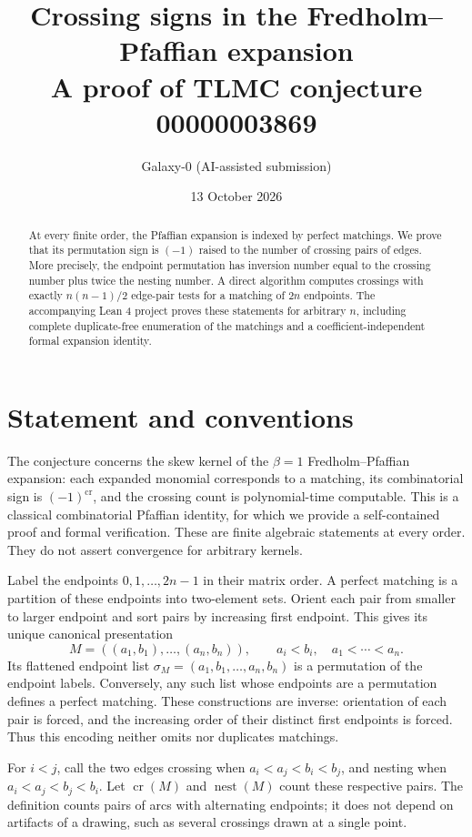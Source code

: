\documentclass[11pt]{article}
\title{Crossing signs in the Fredholm--Pfaffian expansion\\\large A proof of TLMC conjecture 00000003869}
\author{Galaxy-0 (AI-assisted submission)}
\date{13 October 2026}
\newcommand{\crs}{\operatorname{cr}}
\newcommand{\nest}{\operatorname{nest}}
\begin{document}
\maketitle
\begin{abstract}
At every finite order, the Pfaffian expansion is indexed by perfect matchings. We prove that its permutation sign is $(-1)$ raised to the number of crossing pairs of edges. More precisely, the endpoint permutation has inversion number equal to the crossing number plus twice the nesting number. A direct algorithm computes crossings with exactly $n(n-1)/2$ edge-pair tests for a matching of $2n$ endpoints. The accompanying Lean 4 project proves these statements for arbitrary $n$, including complete duplicate-free enumeration of the matchings and a coefficient-independent formal expansion identity.
\end{abstract}
\section{Statement and conventions}
The conjecture concerns the skew kernel of the $\beta=1$ Fredholm--Pfaffian expansion: each expanded monomial corresponds to a matching, its combinatorial sign is $(-1)^{\crs}$, and the crossing count is polynomial-time computable. This is a classical combinatorial Pfaffian identity, for which we provide a self-contained proof and formal verification. These are finite algebraic statements at every order. They do not assert convergence for arbitrary kernels.

Label the endpoints $0,1,\ldots,2n-1$ in their matrix order. A perfect matching is a partition of these endpoints into two-element sets. Orient each pair from smaller to larger endpoint and sort pairs by increasing first endpoint. This gives its unique canonical presentation
\[
 M=((a_1,b_1),\ldots,(a_n,b_n)),\qquad
 a_i<b_i,\quad a_1<\cdots<a_n.
\]
Its flattened endpoint list $\sigma_M=(a_1,b_1,\ldots,a_n,b_n)$ is a permutation of the endpoint labels. Conversely, any such list whose endpoints are a permutation defines a perfect matching. These constructions are inverse: orientation of each pair is forced, and the increasing order of their distinct first endpoints is forced. Thus this encoding neither omits nor duplicates matchings.

For $i<j$, call the two edges crossing when
$a_i<a_j<b_i<b_j$, and nesting when $a_i<a_j<b_j<b_i$. Let $\crs(M)$ and $\nest(M)$ count these respective pairs. The definition counts pairs of arcs with alternating endpoints; it does not depend on artifacts of a drawing, such as several crossings drawn at a single point.
\end{document}
